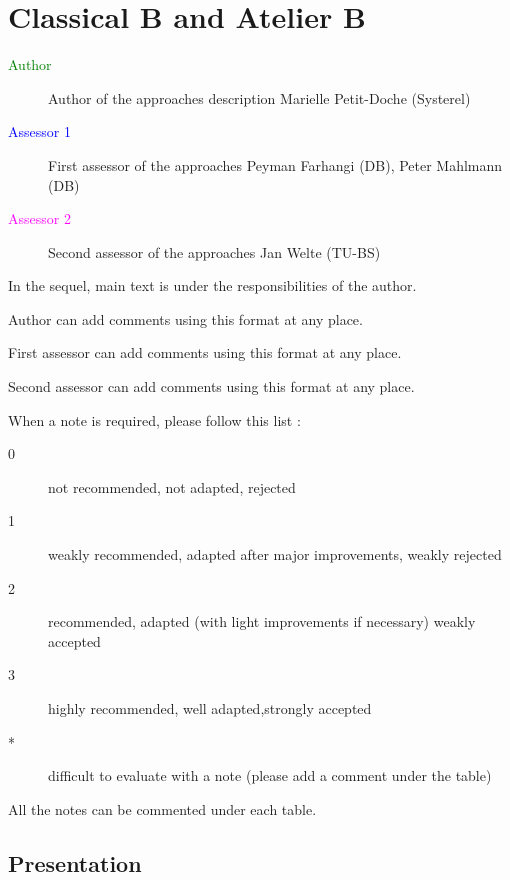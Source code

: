 \chapter{Classical B and Atelier B}
\label{chap:classicalB}


\begin{description}
\item[\textcolor{green}{Author}] Author of the approaches description  Marielle Petit-Doche (Systerel)
\item[\textcolor{blue}{Assessor 1}] First assessor of the approaches Peyman Farhangi (DB), Peter Mahlmann (DB)
\item[\textcolor{magenta}{Assessor 2}] Second assessor of the approaches Jan Welte (TU-BS)
\end{description}

In the sequel, main text is under the responsibilities of the author.

\begin{author_comment}
Author can add comments using this format at any place.
\end{author_comment}

\begin{assessor1}
First assessor can add comments using this format at any place.
\end{assessor1}

\begin{assessor2}
Second assessor can add comments using this format at any place.
\end{assessor2}

When a note is required, please follow this list :
\begin{description}
\item[0] not recommended, not adapted, rejected
\item[1] weakly recommended, adapted after major improvements, weakly rejected
\item[2] recommended, adapted (with light improvements if necessary)  weakly accepted
\item[3] highly recommended, well adapted,strongly accepted
\item[*] difficult to evaluate with a note (please add a comment under the table)
\end{description}

All the notes can be commented under each table.

\section{Presentation}

